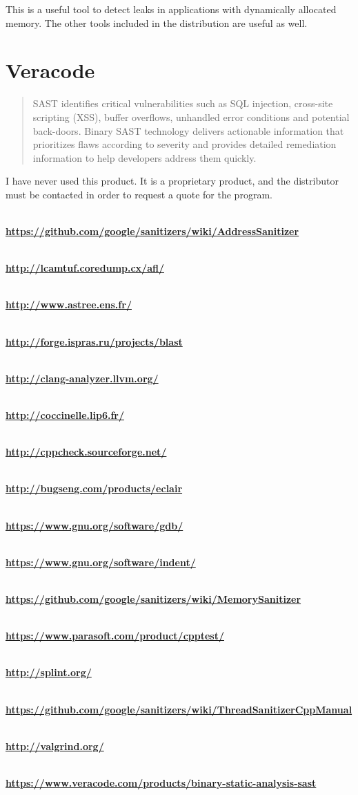\documentclass[12pt]{article}
\let\myurl\url%
\renewcommand{\url}[1]{\hfill \\ \textbf{\myurl{#1}}%
}
\begin{document}
This is a useful tool to detect leaks in applications with dynamically
allocated memory. The other tools included in the distribution are useful
as well.

\cite{valgrind}
\section{Veracode}

\begin{quote}
SAST identifies critical vulnerabilities such as SQL injection,
cross-site scripting (XSS), buffer overflows, unhandled error
conditions and potential back-doors. Binary SAST technology
delivers actionable information that prioritizes flaws according
to severity and provides detailed remediation information to help
developers address them quickly.
\end{quote}

I have never used this product. It is a proprietary product, and the
distributor must be contacted in order to request a quote for the program.

\cite{sast}

\begin{thebibliography}{9}

    \url{https://github.com/google/sanitizers/wiki/AddressSanitizer}
    \url{http://lcamtuf.coredump.cx/afl/}
    \url{http://www.astree.ens.fr/}
    \url{http://forge.ispras.ru/projects/blast}
    \url{http://clang-analyzer.llvm.org/}
    \url{http://coccinelle.lip6.fr/}
    \url{http://cppcheck.sourceforge.net/}
    \url{http://bugseng.com/products/eclair}
    \url{https://www.gnu.org/software/gdb/}
    \url{https://www.gnu.org/software/indent/}
    \url{https://github.com/google/sanitizers/wiki/MemorySanitizer}
    \url{https://www.parasoft.com/product/cpptest/}
    \url{http://splint.org/}
    \url{https://github.com/google/sanitizers/wiki/ThreadSanitizerCppManual}
    \url{http://valgrind.org/}
    \url{https://www.veracode.com/products/binary-static-analysis-sast}

\end{thebibliography}
\end{document}
